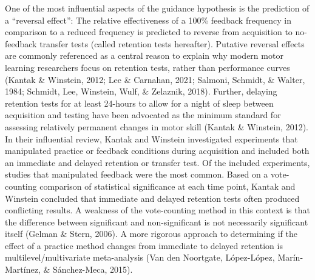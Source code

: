 \documentclass[
  english,
  man,mask,floatsintext]{apa7}
\begin{document}
One of the most influential aspects of the guidance hypothesis is the prediction of a ``reversal effect'': The relative effectiveness of a 100\% feedback frequency in comparison to a reduced frequency is predicted to reverse from acquisition to no-feedback transfer tests (called retention tests hereafter). Putative reversal effects are commonly referenced as a central reason to explain why modern motor learning researchers focus on retention tests, rather than performance curves (Kantak \& Winstein, 2012; Lee \& Carnahan, 2021; Salmoni, Schmidt, \& Walter, 1984; Schmidt, Lee, Winstein, Wulf, \& Zelaznik, 2018). Further, delaying retention tests for at least 24-hours to allow for a night of sleep between acquisition and testing have been advocated as the minimum standard for assessing relatively permanent changes in motor skill (Kantak \& Winstein, 2012). In their influential review, Kantak and Winstein investigated experiments that manipulated practice or feedback conditions during acquisition and included both an immediate and delayed retention or transfer test. Of the included experiments, studies that manipulated feedback were the most common. Based on a vote-counting comparison of statistical significance at each time point, Kantak and Winstein concluded that immediate and delayed retention tests often produced conflicting results. A weakness of the vote-counting method in this context is that the difference between significant and non-significant is not necessarily significant itself (Gelman \& Stern, 2006). A more rigorous approach to determining if the effect of a practice method changes from immediate to delayed retention is multilevel/multivariate meta-analysis (Van den Noortgate, López-López, Marín-Martínez, \& Sánchez-Meca, 2015).
\end{document}
